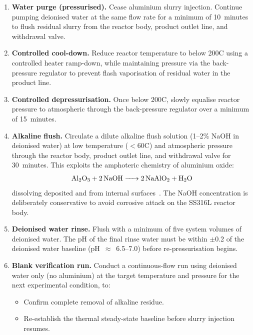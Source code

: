 \documentclass[12pt]{article}
\begin{document}
\begin{enumerate}[label=\textbf{Step \arabic*.}, leftmargin=*, itemsep=6pt]

    \item \textbf{Water purge (pressurised).}
    Cease aluminium slurry injection. Continue pumping deionised water at the same
    flow rate for a minimum of 10~minutes to flush residual  slurry from
    the reactor body, product outlet line, and withdrawal valve.

    \item \textbf{Controlled cool-down.}
    Reduce reactor temperature to below 200\textdegree C using a controlled heater
    ramp-down, while maintaining pressure via the back-pressure regulator to prevent
    flash vaporisation of residual water in the product line.

    \item \textbf{Controlled depressurisation.}
    Once below 200\textdegree C, slowly equalise reactor pressure to atmospheric
    through the back-pressure regulator over a minimum of 15~minutes.

    \item \textbf{Alkaline flush.}
    Circulate a dilute alkaline flush solution (1--2\% NaOH in deionised water) at
    low temperature ($<$60\textdegree C) and atmospheric pressure through the
    reactor body, product outlet line, and withdrawal valve for 30~minutes. This
    exploits the amphoteric chemistry of aluminium oxide:
    \begin{equation}
        \ce{Al2O3 + 2NaOH -> 2NaAlO2 + H2O}
    \end{equation}
    dissolving deposited  and  from internal
    surfaces~\cite{eremin2004}. The NaOH concentration is deliberately conservative
    to avoid corrosive attack on the SS316L reactor body.

    \item \textbf{Deionised water rinse.}
    Flush with a minimum of five system volumes of deionised water. The pH of the
    final rinse water must be within $\pm$0.2 of the deionised water baseline
    (pH~$\approx$~6.5--7.0) before re-pressurisation begins.

    \item \textbf{Blank verification run.}
    Conduct a continuous-flow run using deionised water only (no aluminium) at the
    target temperature and pressure for the next experimental condition, to:
    \begin{itemize}[itemsep=2pt]
        \item Confirm complete removal of alkaline residue.
        \item Re-establish the thermal steady-state baseline before slurry
              injection resumes.
    \end{itemize}

\end{enumerate}
\end{document}
